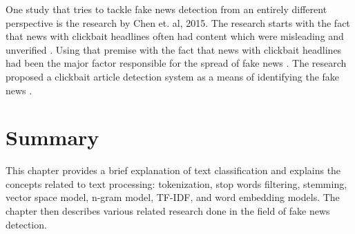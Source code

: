 One study that tries to tackle fake news detection from an entirely different perspective is the research by Chen et. al, 2015. The research starts with the fact that news with clickbait headlines often had content which were misleading and unverified \cite{silverman2016analysis}. Using that premise with the fact that news with clickbait headlines had been the major factor responsible for the spread of fake news \cite{silverman2015lies}. The research proposed a clickbait article detection system as a means of identifying the fake news \cite{chen2015misleading}.

\section{Summary}
This chapter provides a brief explanation of text classification and explains the concepts related to text processing: tokenization, stop words filtering, stemming, vector space model, n-gram model, TF-IDF, and word embedding models. The chapter then describes various related research done in the field of fake news detection.
